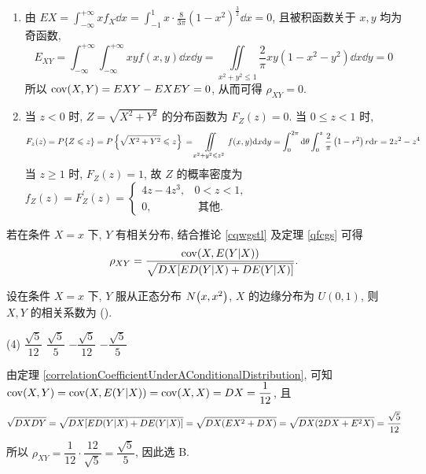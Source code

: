 \begin{solution}
\begin{enumerate}[label=(\arabic{*})]
        \item 由 $\displaystyle EX=\int_{-\infty}^{+\infty} x f_{X} \dd x=\int_{-1}^{1} x \cdot \frac{8}{3 \pi}\left(1-x^{2}\right)^{\frac{3}{2}} \dd x=0$, 且被积函数关于 $ x, y $ 均为奇函数, $$\displaystyle E_{X Y}  =\int_{-\infty}^{+\infty} \int_{-\infty}^{+\infty} x y f(x, y) \dd x \dd y
                  =\iint\limits_{x^{2}+y^{2} \leqslant 1}\frac{2}{\pi} x y\left(1-x^{2}-y^{2}\right) \dd x \dd y=0$$
              所以 $ \mathrm{cov}(X, Y)=E X Y-E X E Y=0 $, 从而可得 $ \rho_{X Y}=0 $.
        \item 当 $ z<0 $ 时, $ Z=\sqrt{X^{2}+Y^{2}} $ 的分布函数为 $ F_{Z}(z)=0 $.
              当 $ 0 \leqslant z<1 $ 时,
              $$
                  F_{z}(z) =P\{Z \leqslant z\}=P\left\{\sqrt{X^{2}+Y^{2}} \leqslant z\right\} \\
                  =\iint\limits_{x^{2}+y^{2} \leqslant z^{2}} f(x, y) \dd x \dd y \\
                  =\int_{0}^{2 \pi} \dd \theta \int_{0}^{z} \frac{2}{\pi}\left(1-r^{2}\right) r \dd r=2 z^{2}-z^{4}
              $$
              当 $ z \geqslant 1 $ 时, $F_{Z}(z)=1 $, 故 $ Z $ 的概率密度为
              $f_{Z}(z)=F_{Z}^{\prime}(z)=\begin{cases}
                      4 z-4 z^{3}, & 0<z<1,          \\
                      0,           & \text { 其他. }
                  \end{cases}$
    \end{enumerate}
\end{solution}

\begin{theorem}[在条件分布下的相关系数]
    \label{correlationCoefficientUnderAConditionalDistribution}
    若在条件 $X=x$ 下, $Y$ 有相关分布, 结合推论 \ref{cqwgstl} 及定理 \ref{qfcgs} 可得 $$
    \rho_{XY}=\dfrac{\mathrm{cov}(X,E(Y|X))}{\sqrt{DX[ED(Y|X)+DE(Y|X)]}}.
    $$
\end{theorem}

\begin{example}
    设在条件 $X=x$ 下, $Y$ 服从正态分布 $N\qty(x,x^2)$, $X$ 的边缘分布为 $U(0,1)$, 则 $X,Y$ 的相关系数为 (\quad).
    \begin{tasks}(4)
        \task $\dfrac{\sqrt{5}}{12}$
        \task $\dfrac{\sqrt{5}}{5}$
        \task $-\dfrac{\sqrt{5}}{12}$
        \task $-\dfrac{\sqrt{5}}{5}$
    \end{tasks}
\end{example}
\begin{solution}
    由定理 \ref{correlationCoefficientUnderAConditionalDistribution}, 可知 $\mathrm{cov}(X,Y)=\mathrm{cov}(X,E(Y|X))=\mathrm{cov}(X,X)=DX=\dfrac{1}{12}$, 且 $$
    \sqrt{DXDY}=\sqrt{DX[ED(Y|X)+DE(Y|X)]}=\sqrt{DX\qty(EX^2+DX)}=\sqrt{DX\qty(2DX+E^2X)}=\dfrac{\sqrt{5}}{12}
    $$
    所以 $\rho_{XY}=\dfrac{1}{12}\cdot\dfrac{12}{\sqrt{5}}=\dfrac{\sqrt{5}}{5}$, 因此选 B.
\end{solution}

